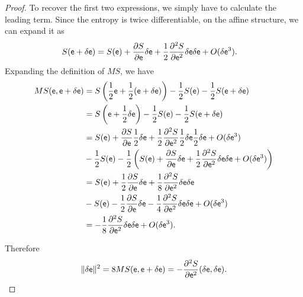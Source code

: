 \begin{mathSection}
\begin{proof}
	To recover the first two expressions, we simply have to calculate the leading term. Since the entropy is twice differentiable, on the affine structure, we can expand it as
	\begin{equation}
		\begin{aligned}
			S(\mathsf{e} + \delta \mathsf{e}) &= S(\mathsf{e}) + \frac{\partial S}{\partial \mathsf{e}} \delta \mathsf{e} + \frac{1}{2} \frac{\partial^2 S}{\partial \mathsf{e}^2} \delta \mathsf{e} \delta \mathsf{e} + O(\delta \mathsf{e} ^3).
		\end{aligned}
	\end{equation}
	Expanding the definition of $MS$, we have
	\begin{equation}
		\begin{aligned}
			MS(\mathsf{e}, \mathsf{e} + \delta \mathsf{e}) &= S\left(\frac{1}{2} \mathsf{e} + \frac{1}{2}(\mathsf{e} + \delta \mathsf{e}) \right) - \frac{1}{2} S(\mathsf{e}) - \frac{1}{2} S(\mathsf{e}+\delta \mathsf{e}) \\
			&=  S\left(\mathsf{e} + \frac{1}{2} \delta \mathsf{e} \right) - \frac{1}{2} S(\mathsf{e}) - \frac{1}{2} S(\mathsf{e}+\delta \mathsf{e}) \\
			&= S(\mathsf{e}) + \frac{\partial S}{\partial \mathsf{e}} \frac{1}{2}\delta \mathsf{e} + \frac{1}{2} \frac{\partial^2 S}{\partial \mathsf{e}^2} \frac{1}{2}\delta \mathsf{e} \frac{1}{2}\delta \mathsf{e} + O(\delta \mathsf{e} ^3) \\
			&- \frac{1}{2} S(\mathsf{e}) - \frac{1}{2} \left( S(\mathsf{e}) + \frac{\partial S}{\partial \mathsf{e}} \delta \mathsf{e} + \frac{1}{2} \frac{\partial^2 S}{\partial \mathsf{e}^2} \delta \mathsf{e} \delta \mathsf{e} + O(\delta \mathsf{e} ^3) \right) \\
			&= S(\mathsf{e}) + \frac{1}{2} \frac{\partial S}{\partial \mathsf{e}} \delta \mathsf{e} + \frac{1}{8} \frac{\partial^2 S}{\partial \mathsf{e}^2} \delta \mathsf{e} \delta \mathsf{e} \\
			&- S(\mathsf{e}) - \frac{1}{2} \frac{\partial S}{\partial \mathsf{e}} \delta \mathsf{e} - \frac{1}{4} \frac{\partial^2 S}{\partial \mathsf{e}^2} \delta \mathsf{e} \delta \mathsf{e} + O(\delta \mathsf{e} ^3) \\
			&= - \frac{1}{8} \frac{\partial^2 S}{\partial \mathsf{e}^2} \delta \mathsf{e} \delta \mathsf{e} + O(\delta \mathsf{e} ^3).
		\end{aligned}
	\end{equation}
	
	Therefore
	$$ \lVert \delta \mathsf{e} \rVert^2 = 8 MS(\mathsf{e}, \mathsf{e} + \delta \mathsf{e}) = -  \frac{\partial^2 S}{\partial \mathsf{e}^2} (\delta \mathsf{e}, \delta \mathsf{e}).$$
	

\end{proof}
\end{mathSection}
